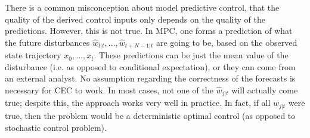  There is a common misconception about model predictive control, that the quality of the derived control inputs only depends on the quality of the predictions.  However, this is not true. In MPC, one forms a prediction of what the future disturbances $\hat{w}_{t|t} ,\ldots,\hat{w}_{t+N-1|t}$ are going to be, based on the observed state trajectory $x_{0},...,x_{t}$. These predictions can be just the mean value of the disturbance (i.e. as opposed to
 conditional expectation), or they can come from an external analyst. No assumption regarding the correctness of the forecasts is necessary for CEC to work.  In most cases, not one of the $\hat{w}_{j|t}$ will actually come true; despite this, the approach works very well in practice. In fact, if all $\hat{w}_{j|t}$ were true, then the problem would be a deterministic optimal control (as opposed to stochastic control problem). %


